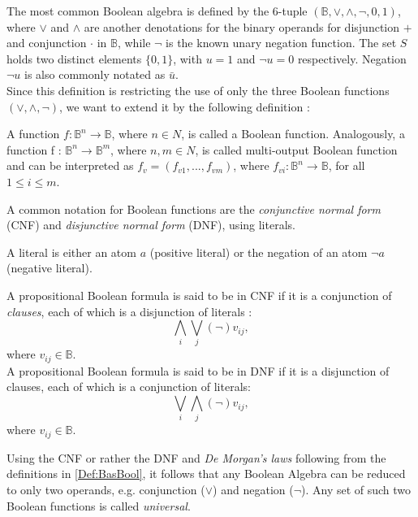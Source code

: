 The most common Boolean algebra is defined by the 6-tuple $(\mathbb{B}, \vee, \wedge, \neg, 0, 1)$, where $\vee$ and $\wedge$ are another denotations for the binary operands for disjunction $+$ and conjunction $\cdot$ in $\mathbb{B}$, while $\neg$ is the known unary negation function. The set $S$ holds two distinct elements $\{0, 1\}$, with $u=1$ and $\neg u = 0$ respectively. Negation $\neg u$ is also commonly notated as $\bar{u}$.\\

Since this definition is restricting the use of only the three Boolean functions $(\vee, \wedge, \neg)$, we want to extend it by the following definition \cite{Walter}:

\begin{definition}
	A function $f : \mathbb{B}^n \to \mathbb{B}$, where $n \in N$, is called a Boolean function.
	Analogously, a
	function f : $\mathbb{B}^n \to \mathbb{B}^m$, where $n, m \in N$, is called multi-output Boolean function
	and can be interpreted as $f_v = (f_{v1}, . . . , f_{vm})$, where $f_{vi} : \mathbb{B}^n \to \mathbb{B}$, for all $1 \leq i \leq m$.
\end{definition}

A common notation for Boolean functions are the \textit{conjunctive normal form} (CNF) and \textit{disjunctive normal form} (DNF), using literals.

\begin{definition}
	A literal is either an atom $a$ (positive literal) or the negation of an atom $\neg a$ (negative literal).
\end{definition}

\begin{definition}
A propositional Boolean formula is said to be in CNF if it is a conjunction of \textit{clauses}, each of which is a disjunction of literals \cite{CNF}:\\
\[\displaystyle\bigwedge_{i} \displaystyle\bigvee_{j} (\neg) v_{ij}, \]
where $v_{ij} \in \mathbb{B}$.\\
A propositional Boolean formula is said to be in DNF if it is a disjunction of clauses, each of which is a conjunction of literals:\\
\[ \displaystyle\bigvee_{i} \displaystyle\bigwedge_{j} (\neg) v_{ij}, \]
where $v_{ij} \in \mathbb{B}$.

\end{definition}

Using the CNF or rather the DNF and \textit{De Morgan's laws} following from the definitions in \ref{Def:BasBool}, it follows that any Boolean Algebra can be reduced to only two operands, e.g. conjunction ($\vee$) and negation ($\neg$). Any set of such two Boolean functions is called \textit{universal}.


